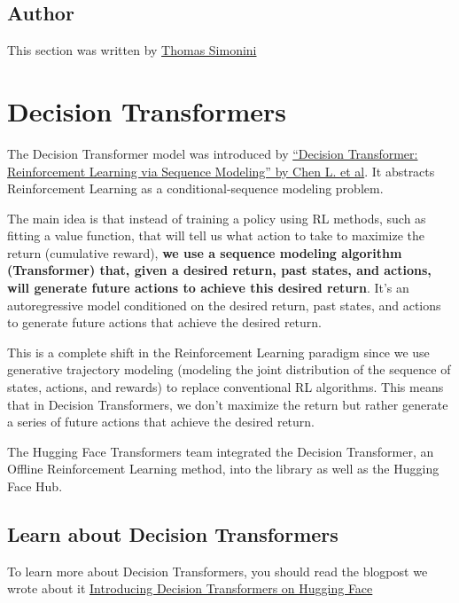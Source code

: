 \documentclass[11pt,a4paper]{article}
\begin{document}
\subsection{Author}\label{author-2}

This section was written by \href{https://twitter.com/ThomasSimonini}{Thomas Simonini}

\section{Decision Transformers}\label{decision-transformers}

The Decision Transformer model was introduced by \href{https://arxiv.org/abs/2106.01345}{``Decision Transformer: Reinforcement Learning via Sequence Modeling'' by Chen L. et al}. It abstracts Reinforcement Learning as a conditional-sequence modeling problem.

The main idea is that instead of training a policy using RL methods, such as fitting a value function, that will tell us what action to take to maximize the return (cumulative reward), \textbf{we use a sequence modeling algorithm (Transformer) that, given a desired return, past states, and actions, will generate future actions to achieve this desired return}. It's an autoregressive model conditioned on the desired return, past states, and actions to generate future actions that achieve the desired return.

This is a complete shift in the Reinforcement Learning paradigm since we use generative trajectory modeling (modeling the joint distribution of the sequence of states, actions, and rewards) to replace conventional RL algorithms. This means that in Decision Transformers, we don't maximize the return but rather generate a series of future actions that achieve the desired return.

The Hugging Face Transformers team integrated the Decision Transformer, an Offline Reinforcement Learning method, into the library as well as the Hugging Face Hub.

\subsection{Learn about Decision Transformers}\label{learn-about-decision-transformers}

To learn more about Decision Transformers, you should read the blogpost we wrote about it \href{https://huggingface.co/blog/decision-transformers}{Introducing Decision Transformers on Hugging Face}
\end{document}
